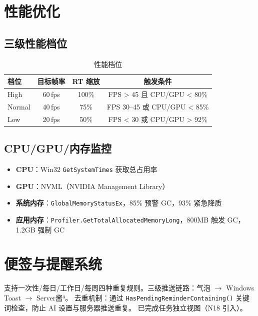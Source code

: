 \documentclass[12pt,a4paper]{ctexart}
\begin{document}
\section{性能优化}

\subsection{三级性能档位}

\begin{table}[H]
\centering
\caption{性能档位}
\label{tab:perf}
\begin{tabular}{lccc}
\toprule
\textbf{档位} & \textbf{目标帧率} & \textbf{RT 缩放} & \textbf{触发条件} \\
\midrule
High & 60\,fps & 100\% & FPS > 45 且 CPU/GPU < 80\% \\
Normal & 40\,fps & 75\% & FPS 30--45 或 CPU/GPU < 85\% \\
Low & 20\,fps & 50\% & FPS < 30 或 CPU/GPU > 92\% \\
\bottomrule
\end{tabular}
\end{table}

\subsection{CPU/GPU/内存监控}

\begin{itemize}
    \item \textbf{CPU}：Win32 \texttt{GetSystemTimes} 获取总占用率
    \item \textbf{GPU}：NVML（NVIDIA Management Library）
    \item \textbf{系统内存}：\texttt{GlobalMemoryStatusEx}，85\% 预警 GC，93\% 紧急降质
    \item \textbf{应用内存}：\texttt{Profiler.GetTotalAllocatedMemoryLong}，800MB 触发 GC，1.2GB 强制 GC
\end{itemize}

\section{便签与提醒系统}

支持一次性/每日/工作日/每周四种重复规则。三级推送链路：气泡 $\rightarrow$ Windows Toast $\rightarrow$ Server酱³。
去重机制：通过 \texttt{HasPendingReminderContaining()} 关键词检查，防止 AI 设置与服务器推送重复。
已完成任务独立视图（N18 引入）。
\end{document}
